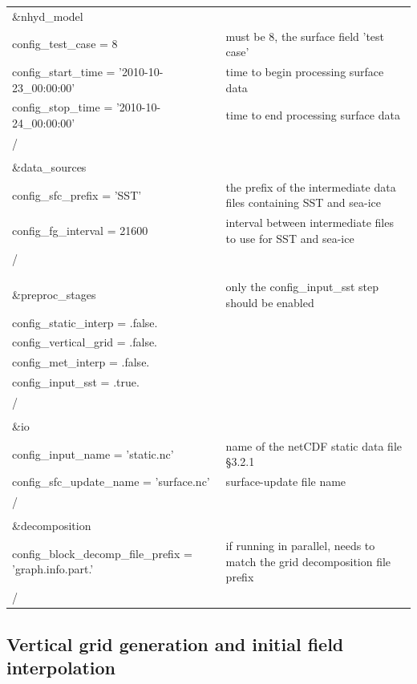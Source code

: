 \documentclass[11pt]{report}
\begin{document}
\begin{longtable}{p{3.0in} |p{3.25in}}
\&nhyd\_model\\
   config\_test\_case       = 8                      & must be 8, the surface field 'test case' \\
   config\_start\_time      = '2010-10-23\_00:00:00' & time to begin processing surface data \\
   config\_stop\_time       = '2010-10-24\_00:00:00' & time to end processing surface data \\
/\\
\\
\&data\_sources\\
   config\_sfc\_prefix      = 'SST'                  & the prefix of the intermediate data files containing SST and sea-ice \\
   config\_fg\_interval     = 21600                  & interval between intermediate files to use for SST and sea-ice \\
/\\
\\
\\
\&preproc\_stages                                    & only the config\_input\_sst step should be enabled \\
   config\_static\_interp   = .false.                & \\
   config\_vertical\_grid   = .false.                & \\
   config\_met\_interp      = .false.                & \\
   config\_input\_sst       = .true.                 & \\
/\\
\\
\&io\\
   config\_input\_name          = 'static.nc'        & name of the netCDF static data file \S 3.2.1 \\
   config\_sfc\_update\_name    = 'surface.nc'       & surface-update file name \\
/\\
\\
\&decomposition\\
   config\_block\_decomp\_file\_prefix = 'graph.info.part.' & if running in parallel, needs to match the grid decomposition file prefix \\
/\\

\end{longtable}



\subsection{Vertical grid generation and initial field interpolation}
\end{document}
